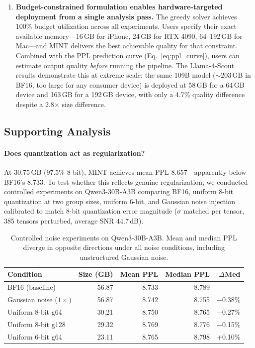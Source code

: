 \documentclass{article}
\begin{document}
\begin{enumerate}
\item \textbf{Budget-constrained formulation enables hardware-targeted deployment from a single analysis pass.}
The greedy solver achieves 100\% budget utilization across all experiments. Users specify their exact available memory---16\,GB for iPhone, 24\,GB for RTX 4090, 64--192\,GB for Mac---and MINT delivers the best achievable quality for that constraint. Combined with the PPL prediction curve (Eq.~\ref{eq:ppl_curve}), users can estimate output quality \emph{before} running the pipeline. The Llama-4-Scout results demonstrate this at extreme scale: the same 109B model (${\sim}$203\,GB in BF16, too large for any consumer device) is deployed at 58\,GB for a 64\,GB device and 163\,GB for a 192\,GB device, with only a 4.7\% quality difference despite a 2.8$\times$ size difference.

\end{enumerate}

\subsection{Supporting Analysis}

\paragraph{Does quantization act as regularization?}
\label{sec:quant_noise}
At 30.75\,GB (97.5\% 8-bit), MINT achieves mean PPL 8.657---apparently below BF16's 8.733. To test whether this reflects genuine regularization, we conducted controlled experiments on Qwen3-30B-A3B comparing BF16, uniform 8-bit quantization at two group sizes, uniform 6-bit, and Gaussian noise injection calibrated to match 8-bit quantization error magnitude ($\sigma$ matched per tensor, 385 tensors perturbed, average SNR 44.7\,dB).

\begin{table}[h]
\centering
\caption{Controlled noise experiments on Qwen3-30B-A3B. Mean and median PPL diverge in opposite directions under all noise conditions, including unstructured Gaussian noise.}
\label{tab:noise_experiment}
\begin{tabular}{lrrrr}
\toprule
Condition & Size (GB) & Mean PPL & Median PPL & $\Delta$Med \\
\midrule
BF16 (baseline) & 56.87 & 8.733 & 8.789 & --- \\
Gaussian noise ($1\times$) & 56.87 & 8.742 & 8.755 & $-$0.38\% \\
Uniform 8-bit g64 & 30.21 & 8.750 & 8.765 & $-$0.27\% \\
Uniform 8-bit g128 & 29.32 & 8.769 & 8.776 & $-$0.15\% \\
Uniform 6-bit g64 & 23.11 & 8.765 & 8.798 & +0.10\% \\
\bottomrule
\end{tabular}
\end{table}
\end{document}
